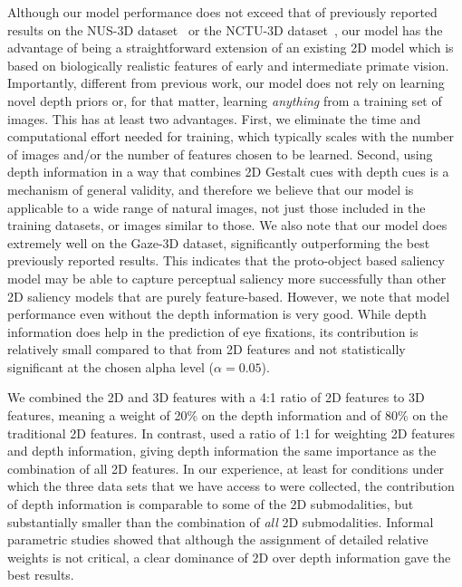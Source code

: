 \documentclass[12pt]{article}
\begin{document}
Although our model performance does not exceed that of previously
reported results on the NUS-3D dataset~\citep{Lang_etal12} or the
NCTU-3D dataset~\citep{Ma_Hang15}, 
our model 
has the advantage of being
a straightforward extension of an
 existing 2D model \citep{Russell_etal14} which is based on
biologically realistic
features of early and intermediate primate vision. Importantly, 
different from previous work, our model
does not rely on learning novel depth priors or, for that matter,
learning {\em
  anything}  from a training set of images. This has at least two
advantages. First, we eliminate the time and computational
effort needed for training, which typically scales with the number of
images and/or the number of features chosen to be learned. Second, 
using depth information in a way that combines 2D Gestalt cues with
depth cues
is a mechanism of general validity, and therefore
we believe that our model is applicable to a
wide range of natural images, not just those included in the
training datasets, or images similar to those. We also note that our model does extremely well on the Gaze-3D dataset, significantly outperforming the best previously reported results. This indicates that the proto-object based saliency
model may be able to capture perceptual saliency more successfully
than other 2D saliency models that are purely feature-based.
However, we note that model performance even without the depth information is
very good. While depth information does help in the prediction of eye fixations, its contribution is relatively small compared to that from
2D features and not statistically significant at the chosen alpha level ($\alpha = 0.05$).

We combined the 2D and 3D features with a 4:1 ratio of 2D features to
3D features, meaning a weight of 20\% on the depth information and 
of 80\% on the traditional 2D features. In contrast,
\cite{Wang_etal13} used a ratio of 1:1 for weighting 2D features
and depth information, giving depth information the same
importance as the combination of all  2D features.
In our experience, at least for conditions under which the three data
sets that we have access to were collected, the contribution of depth
information is comparable to some of the 2D submodalities, but
substantially smaller than the combination of {\em all} 2D
submodalities. Informal parametric studies showed that although the
assignment of  detailed relative weights is not critical, a clear
dominance of 2D over depth information gave the best results. 
\end{document}
